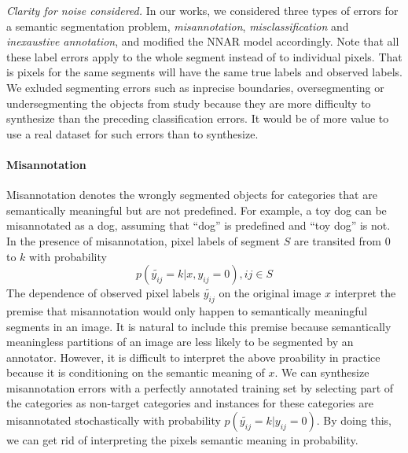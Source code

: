 \noindent \textit{Clarity for noise considered.}
\noindent
In our works, we considered three types of errors for a semantic segmentation problem, \textit{misannotation}, \textit{misclassification} and \textit{inexaustive annotation}, and modified the NNAR model accordingly.
Note that all these label errors apply to the whole segment instead of to individual pixels.
That is pixels for the same segments will have the same true labels and observed labels.
We exluded segmenting errors such as inprecise boundaries, oversegmenting or undersegmenting the objects from study because they are more difficulty to synthesize than the preceding classification errors.
It would be of more value to use a real dataset for such errors than to synthesize.



\paragraph{Misannotation}
\noindent
Misannotation denotes the wrongly segmented objects for categories that are semantically meaningful but are not predefined.
For example, a toy dog can be misannotated as a dog, assuming that ``dog'' is predefined and ``toy dog'' is not.
In the presence of misannotation, pixel labels of segment $S$ are transited from $0$ to $k$ with probability
$$p(\tilde{y_{ij}}=k \vert x, y_{ij}=0), ij \in S $$
The dependence of observed pixel labels $\tilde{y_{ij}}$ on the original image $x$ interpret the premise that misannotation would only happen to semantically meaningful segments in an image.
It is natural to include this premise because semantically meaningless partitions of an image are less likely to be segmented by an annotator.
However, it is difficult to interpret the above proability in practice because it is conditioning on the semantic meaning of $x$.
We can synthesize misannotation errors with a perfectly annotated training set by selecting part of the categories as non-target categories and instances for these categories are misannotated stochastically with probability   $p(\tilde{y_{ij}}=k \vert y_{ij}=0)$.
By doing this, we can get rid of interpreting the pixels semantic meaning in probability.

